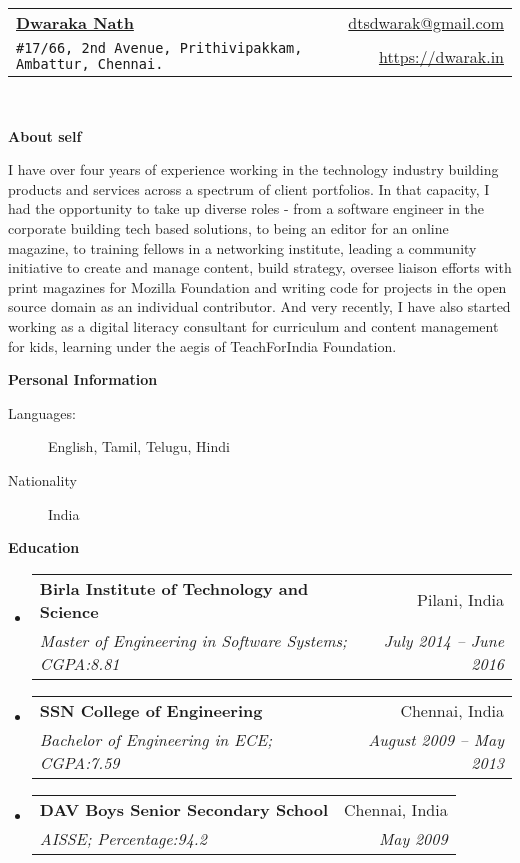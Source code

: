 \documentclass[letterpaper,11pt]{article}
\makeatletter
\newcommand{\resheading}[1]{{\large \colorbox{mygrey}{\begin{minipage}{\textwidth}{\textbf{#1 \vphantom{p\^{E}}}}\end{minipage}}}}
\newcommand{\ressubheading}[4]{
\begin{tabular*}{6.5in}{l@{\extracolsep{\fill}}r}
		\textbf{#1} & #2 \\
		\textit{#3} & \textit{#4} \\
\end{tabular*}\vspace{-6pt}}
\makeatother
\begin{document}
\newcommand{\mywebheader}{
\begin{tabular*}{7in}{l@{\extracolsep{\fill}}r}
	\textbf{\href{https://dwarak.in/}{\LARGE Dwaraka Nath}} & \href{mailto:dtsdwarak@gmail.com}{dtsdwarak@gmail.com}\\
	{\footnotesize \texttt{\#17/66, 2nd Avenue, Prithivipakkam, Ambattur, Chennai.}} & \href{https://dwarak.in}{https://dwarak.in} \\
	\end{tabular*}
\\
\vspace{0.3in}}

\mywebheader

\resheading{About self}
    \begin{flushleft}
    \justifying
    \small  {
    I have over four years of experience working in the technology industry building products and services across a spectrum of client portfolios. In that capacity, I had the opportunity to take up diverse roles - from a software engineer in the corporate building tech based solutions, to being an editor for an online magazine, to training fellows in a networking institute, leading a community initiative to create and manage content, build strategy, oversee liaison efforts with print magazines for Mozilla Foundation and writing code for projects in the open source domain as an individual contributor. And very recently, I have also started working as a digital literacy consultant for curriculum and content management for kids, learning under the aegis of TeachForIndia Foundation.}
    \end{flushleft}
    
\resheading{Personal Information}
	\begin{description}
		\item[Languages:] { \footnotesize English, Tamil, Telugu, Hindi
		}
		\item[Nationality] { \footnotesize India
		}
	\end{description} %

\resheading{Education}
	\begin{itemize}
		\item
			\ressubheading{{Birla Institute of Technology and Science}}{Pilani, India}{{Master of Engineering in Software Systems};{ CGPA:8.81}}{July 2014 -- June 2016}
		\item
			\ressubheading{{SSN College of Engineering}}{Chennai, India}{{Bachelor of Engineering in ECE};{ CGPA:7.59}}{August 2009 -- May 2013}
		\item
			\ressubheading{{DAV Boys Senior Secondary School}}{Chennai, India}{{AISSE};{ Percentage:94.2}}{May 2009}			
	\end{itemize} %
\end{document}
